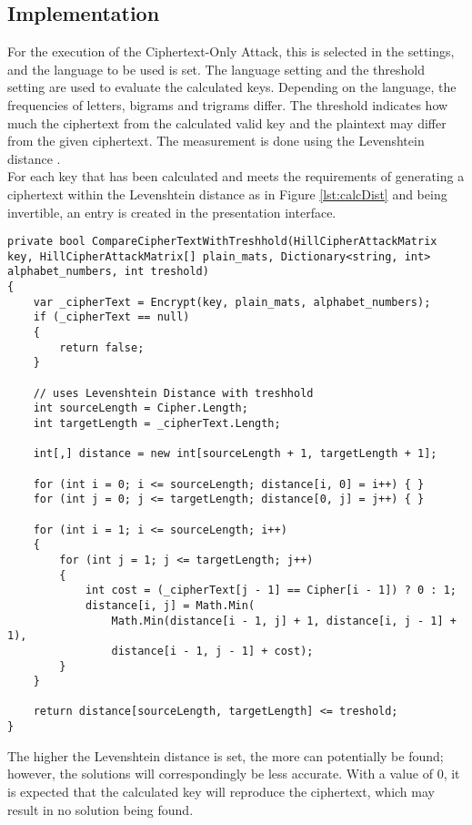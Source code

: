 \documentclass[conference]{IEEEtran}
\begin{document}
\subsection{Implementation}
For the execution of the Ciphertext-Only Attack, this is selected in the settings, and the language to be used is set. The language setting and the threshold setting are used to evaluate the calculated keys. Depending on the language, the frequencies of letters, bigrams and trigrams differ. The threshold indicates how much the ciphertext from the calculated valid key and the plaintext may differ from the given ciphertext. The measurement is done using the Levenshtein distance \cite{b5}.
\\
For each key that has been calculated and meets the requirements of generating a ciphertext within the Levenshtein distance as in Figure \ref{lst:calcDist} and being invertible, an entry is created in the presentation interface. 
\\
\begin{lstlisting}[caption={CompareCipherTextWithTreshhold method}, label={lst:calcDist}]
private bool CompareCipherTextWithTreshhold(HillCipherAttackMatrix key, HillCipherAttackMatrix[] plain_mats, Dictionary<string, int> alphabet_numbers, int treshold)
{
    var _cipherText = Encrypt(key, plain_mats, alphabet_numbers);
    if (_cipherText == null)
    {
        return false;
    }

    // uses Levenshtein Distance with treshhold
    int sourceLength = Cipher.Length;
    int targetLength = _cipherText.Length;

    int[,] distance = new int[sourceLength + 1, targetLength + 1];

    for (int i = 0; i <= sourceLength; distance[i, 0] = i++) { }
    for (int j = 0; j <= targetLength; distance[0, j] = j++) { }

    for (int i = 1; i <= sourceLength; i++)
    {
        for (int j = 1; j <= targetLength; j++)
        {
            int cost = (_cipherText[j - 1] == Cipher[i - 1]) ? 0 : 1;
            distance[i, j] = Math.Min(
                Math.Min(distance[i - 1, j] + 1, distance[i, j - 1] + 1),
                distance[i - 1, j - 1] + cost);
        }
    }

    return distance[sourceLength, targetLength] <= treshold;
}
\end{lstlisting}

The higher the Levenshtein distance is set, the more can potentially be found; however, the solutions will correspondingly be less accurate. With a value of 0, it is expected that the calculated key will reproduce the ciphertext, which may result in no solution being found.\\
\end{document}
